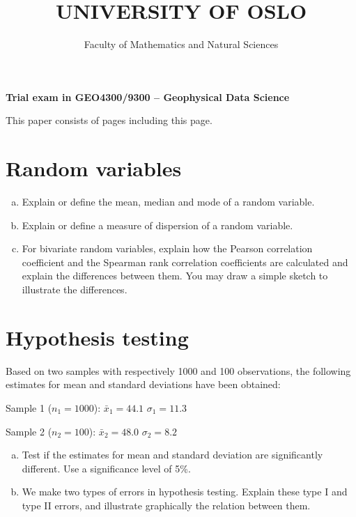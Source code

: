 \documentclass[12pt]{article}
\date{}
\begin{document}
\author{Faculty of Mathematics and Natural Sciences}

\title{UNIVERSITY OF OSLO}

\maketitle 
\begin{center}
\textbf{Trial exam in GEO4300/9300 -- Geophysical Data Science}
\end{center}

This paper consists of \pageref{LastPage} pages including this page. \\


\pagebreak


\section{Random variables}

\begin{enumerate}[(a)] 
\item Explain or define the mean, median and mode of a random variable.
\item Explain or define a measure of dispersion of a random variable.
\item For bivariate random variables, explain how the Pearson correlation coefficient and the Spearman rank correlation coefficients are calculated and explain the differences between them. You may draw a simple sketch to illustrate the differences.
\end{enumerate}




\section{Hypothesis testing}
Based on two samples with respectively 1000 and 100 observations, the following estimates for mean and standard deviations have been obtained:

Sample 1 ($n_1=1000$): \hspace{0.3in} $\bar{x}_1=44.1$ \hspace{0.3in} $\sigma_1=11.3$

Sample 2 ($n_2=100$): \hspace{0.3in} $\bar{x}_2=48.0$ \hspace{0.3in} $\sigma_2=8.2$


\begin{enumerate}[(a)] 
    \item Test if the estimates for mean and standard deviation are significantly different. Use a significance level of 5\%.
	\item We make two types of errors in hypothesis testing. Explain these type I and type II errors, and illustrate graphically the relation between them.
\end{enumerate}
\end{document}
